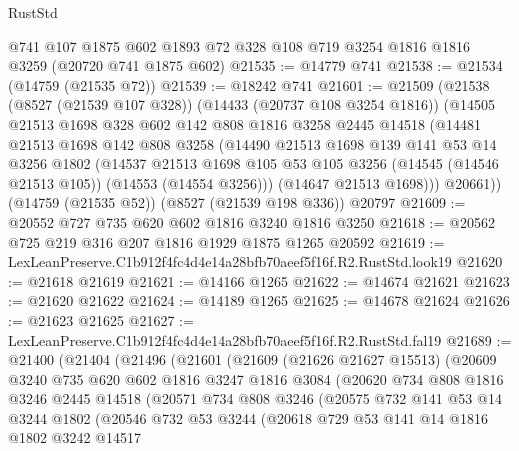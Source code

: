 \begin{lexlean}{RustStd}
\begin{coremodule}
    @741
    @107
    @1875
    @602
    @1893
    @72
    @328
    @108
    @719
    @3254
    @1816
    @1816
    @3259
    (@20720 @741 @1875 @602)
@21535 := @14779 @741
@21538 := @21534 (@14759 (@21535 @72))
@21539 := @18242 @741
@21601 := @21509
    (@21538
      (@8527 (@21539 @107 @328))
      (@14433 (@20737 @108 @3254 @1816))
      (@14505
        @21513
        @1698
        @328
        @602
        @142
        @808
        @1816
        @3258
        @2445
        @14518
        (@14481
          @21513
          @1698
          @142
          @808
          @3258
          (@14490
            @21513
            @1698
            @139
            @141
            @53
            @14
            @3256
            @1802
            (@14537
              @21513
              @1698
              @105
              @53
              @105
              @3256
              (@14545 (@14546 @21513 @105))
              (@14553 (@14554 @3256)))
            (@14647 @21513 @1698)))
        @20661))
    (@14759 (@21535 @52))
    (@8527 (@21539 @198 @336))
    @20797
@21609 := @20552 @727 @735 @620 @602 @1816 @3240 @1816 @3250
@21618 := @20562 @725 @219 @316 @207 @1816 @1929 @1875 @1265 @20592
@21619 := LexLeanPreserve.C1b912f4fc4d4e14a28bfb70aeef5f16f.R2.RustStd.look19
@21620 := @21618 @21619
@21621 := @14166 @1265
@21622 := @14674 @21621
@21623 := @21620 @21622
@21624 := @14189 @1265
@21625 := @14678 @21624
@21626 := @21623 @21625
@21627 := LexLeanPreserve.C1b912f4fc4d4e14a28bfb70aeef5f16f.R2.RustStd.fal19
@21689 := @21400
    (@21404
      (@21496
        (@21601
          (@21609
            (@21626 @21627 @15513)
            (@20609
              @3240
              @735
              @620
              @602
              @1816
              @3247
              @1816
              @3084
              (@20620
                @734
                @808
                @1816
                @3246
                @2445
                @14518
                (@20571
                  @734
                  @808
                  @3246
                  (@20575
                    @732
                    @141
                    @53
                    @14
                    @3244
                    @1802
                    (@20546
                      @732
                      @53
                      @3244
                      (@20618
                        @729
                        @53
                        @141
                        @14
                        @1816
                        @1802
                        @3242
                        @14517

\end{coremodule}
\end{lexlean}
